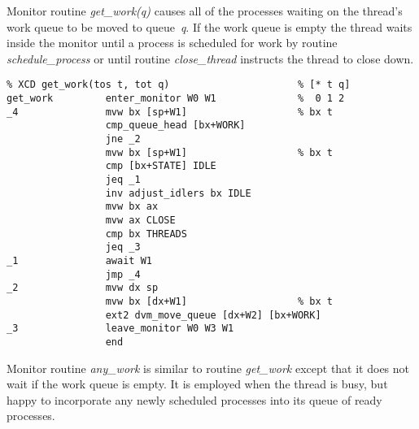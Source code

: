 Monitor routine \emph{get\_work(q)} causes all of the processes waiting on the thread's work queue to be moved to queue~\emph{q}. If the work queue is empty the thread waits inside the monitor until a process is scheduled for work by routine \emph{schedule\_process} or until routine \emph{close\_thread} instructs the thread to close down.

\begin{tabbing}
\indents
{}
\finmore
\end{tabbing}

{\small
\begin{verbatim}
% XCD get_work(tos t, tot q)                      % [* t q]
get_work         enter_monitor W0 W1              %  0 1 2
_4               mvw bx [sp+W1]                   % bx t
                 cmp_queue_head [bx+WORK]
                 jne _2
                 mvw bx [sp+W1]                   % bx t
                 cmp [bx+STATE] IDLE
                 jeq _1
                 inv adjust_idlers bx IDLE
                 mvw bx ax
                 mvw ax CLOSE
                 cmp bx THREADS
                 jeq _3
_1               await W1
                 jmp _4
_2               mvw dx sp
                 mvw bx [dx+W1]                   % bx t
                 ext2 dvm_move_queue [dx+W2] [bx+WORK]
_3               leave_monitor W0 W3 W1
                 end
\end{verbatim}}

Monitor routine \emph{any\_work} is similar to routine \emph{get\_work} except that it does not wait if the work queue is empty. It is employed when the thread is busy, but happy to incorporate any newly scheduled processes into its queue of ready processes.

\begin{tabbing}
\indents
{}
\finmore
\end{tabbing}

